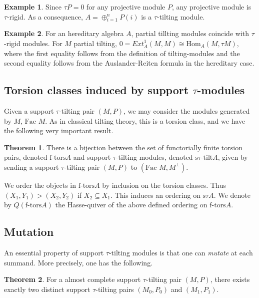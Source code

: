 \documentclass[]{article}
\theoremstyle{definition}
\newtheorem{theorem}{Theorem}[section]
\newtheorem{example}{Example}[section]
\newcommand{\Hom}{\ensuremath{\text{Hom}}}
\newcommand{\tu}{\ensuremath{\tau}}
\newcommand{\Fac}{\ensuremath{\text{Fac }}}
\begin{document}
\begin{example}
	Since $\tu P = 0$ for any projective module $P$, any projective module is \tu-rigid. As a consequence, $A = \oplus_{i = 1}^n P(i)$ is a \tu-tilting module.	
\end{example}

\begin{example}
	For an hereditary algebra $A$, partial tillting modules coincide with \tu-rigid modules. For $M$ partial tilting, $0 = Ext^1_A(M,M) \cong \Hom_A(M,\tu M)$, where the first equality follows from the definition of tilting-modules and the second equality follows from the Auslander-Reiten formula in the hereditary case.
\end{example}

\subsection{Torsion classes induced by support \tu-modules}
Given a support \tu-tilting pair $(M,P)$, we may consider the modules generated by $M$, $\Fac M$. As in classical tilting theory, this is a torsion class, and we have the following very important result.

\begin{theorem}\cite[Theorem 2.7]{tau}\cite{auslandersmalo81}
	There is a bijection between the set of functorially finite torsion pairs, denoted $\text{f-tors} A$ and support \tu-tilting modules, denoted $\text{s}\tu\text{-tilt} A$, given by sending a support \tu-tilting pair $(M,P)$ to $(\Fac M,M^\perp)$.
\end{theorem}

We order the objects in $\text{f-tors} A$ by inclusion on the torsion classes. Thus $(X_1,Y_1) > (X_2,Y_2)$ if $X_2 \subseteq X_1$. This induces an ordering on $\text{s}\tu A$. We denote by $Q(\text{f-tors} A)$ the Hasse-quiver of the above defined ordering on $\text{f-tors} A$.

\subsection{Mutation}
An essential property of support \tu-tilting modules is that one can \textit{mutate} at each summand. More precisely, one has the following.

\begin{theorem}
	For a almost complete support $\tau$-tilting pair $(M,P)$, there exists exactly two distinct support \tu-tilting pairs $(M_0,P_0)$ and $(M_1,P_1)$.
\end{theorem}
\end{document}
